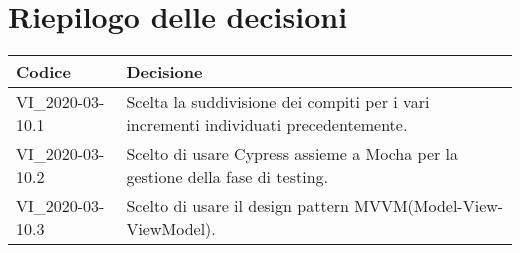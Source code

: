\section{Riepilogo delle decisioni}
\setcounter{table}{-1}
{

\centering
\renewcommand{\arraystretch}{1.5}
\begin{longtable}{>{\centering}p{} >{}p{}}
\rowcolor{azzurro1}
\textbf{Codice} &
\centerline{\textbf{Decisione}}\\
\endhead

VI{\_}2020-03-10.1 & Scelta la suddivisione dei compiti per i vari incrementi individuati precedentemente.\\
VI{\_}2020-03-10.2 & Scelto di usare Cypress assieme a Mocha per la gestione della fase di testing.\\
VI{\_}2020-03-10.3 & Scelto di usare il design pattern MVVM(Model-View-ViewModel).\\
\end{longtable}
}